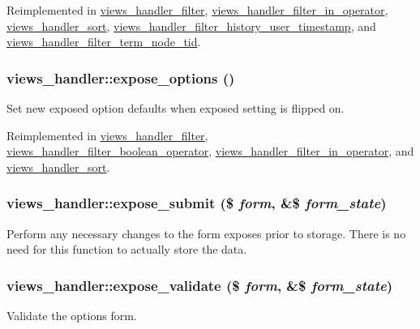 Reimplemented in \hyperlink{classviews__handler__filter_a9537c9a30fb9008361efdfdde46633cd}{views\_\-handler\_\-filter}, \hyperlink{classviews__handler__filter__in__operator_a23bfbd98ea5838480365b21e952bf9f4}{views\_\-handler\_\-filter\_\-in\_\-operator}, \hyperlink{classviews__handler__sort_ace8ed050d99d5aa5eaca415201b350e9}{views\_\-handler\_\-sort}, \hyperlink{classviews__handler__filter__history__user__timestamp_a1977bbf7abbeaf89266ae9a7057c7cd7}{views\_\-handler\_\-filter\_\-history\_\-user\_\-timestamp}, and \hyperlink{classviews__handler__filter__term__node__tid_abf972bb53512f371af5c1ec32048f686}{views\_\-handler\_\-filter\_\-term\_\-node\_\-tid}.\hypertarget{classviews__handler_a2db9f3127a5364b17fb775cede2f43a6}{
\subsubsection[{expose\_\-options}]{\setlength{\rightskip}{0pt plus 5cm}views\_\-handler::expose\_\-options ()}}
\label{classviews__handler_a2db9f3127a5364b17fb775cede2f43a6}
Set new exposed option defaults when exposed setting is flipped on. 

Reimplemented in \hyperlink{classviews__handler__filter_a07ab6afc47bf892fb5fd5934c3f1d64c}{views\_\-handler\_\-filter}, \hyperlink{classviews__handler__filter__boolean__operator_a24ff1f565f02838bc2a63939ab510d89}{views\_\-handler\_\-filter\_\-boolean\_\-operator}, \hyperlink{classviews__handler__filter__in__operator_a0ed328117721ce41a3744f0339c16527}{views\_\-handler\_\-filter\_\-in\_\-operator}, and \hyperlink{classviews__handler__sort_a7a27b9f392c9e0dcece1b08e9b05f3ec}{views\_\-handler\_\-sort}.\hypertarget{classviews__handler_a5f15ebff11663447d514247c2ce7744a}{
\subsubsection[{expose\_\-submit}]{\setlength{\rightskip}{0pt plus 5cm}views\_\-handler::expose\_\-submit (\$ {\em form}, \/  \&\$ {\em form\_\-state})}}
\label{classviews__handler_a5f15ebff11663447d514247c2ce7744a}
Perform any necessary changes to the form exposes prior to storage. There is no need for this function to actually store the data. \hypertarget{classviews__handler_a6590edeadc036c3db0e64baa2383909e}{
\subsubsection[{expose\_\-validate}]{\setlength{\rightskip}{0pt plus 5cm}views\_\-handler::expose\_\-validate (\$ {\em form}, \/  \&\$ {\em form\_\-state})}}
\label{classviews__handler_a6590edeadc036c3db0e64baa2383909e}
Validate the options form. 

